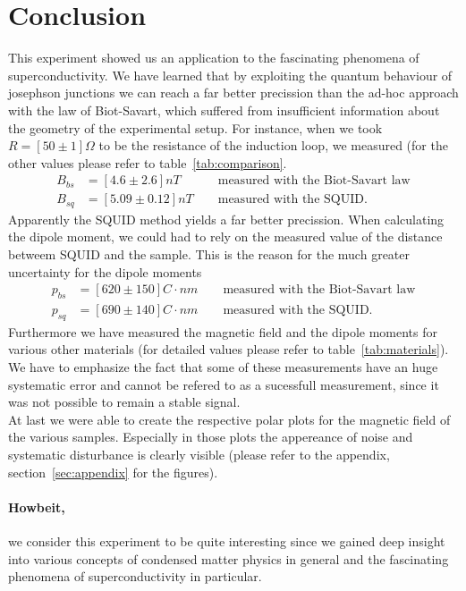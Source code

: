 \FloatBarrier
\clearpage
\section{Conclusion}
This experiment showed us an application to the fascinating phenomena
of superconductivity. We have learned that by exploiting 
the quantum behaviour of josephson junctions we can reach a far better
precission than the ad-hoc approach with the law of Biot-Savart, which suffered
from insufficient information about the geometry of the experimental setup.
For instance, when we took $R=[50\pm1] \Omega$ to be the resistance of the induction loop,
we measured (for the other values please refer to table~\ref{tab:comparison}.
\begin{align*}
B_{bs} &= [4.6\pm 2.6] nT   \qquad \quad \text{measured with the Biot-Savart law} \\ 
B_{sq} &= [5.09\pm0.12] nT \qquad \text{measured with the SQUID}.
\end{align*}
Apparently the SQUID method yields a far better precission.
When calculating the dipole moment, we could had to rely on the measured
value of the distance betweem SQUID and the sample. This is the reason
for the much greater uncertainty for the dipole moments
\begin{align*}
p_{bs} &= [620\pm150] C\cdot nm  \qquad \text{measured with the Biot-Savart law} \\ 
p_{sq} &= [690\pm140] C\cdot nm  \qquad \text{measured with the SQUID}.
\end{align*}
Furthermore we have measured the magnetic field and the dipole moments for
various other materials (for detailed values please refer to 
table~\ref{tab:materials}). We have to emphasize the fact that some of
these measurements have an huge systematic error and cannot be refered 
to as a sucessfull measurement, since it was not possible to remain a 
stable signal. \\
At last we were able to create the respective polar plots for the 
magnetic field of the various samples. Especially in those plots the
appereance of noise and systematic disturbance is clearly visible (please
refer to the appendix, section~\ref{sec:appendix} for the figures). 

\paragraph{Howbeit,} we consider this experiment to be quite interesting since we gained deep 
insight into various concepts of condensed matter physics in general and the
fascinating phenomena of superconductivity in particular.
